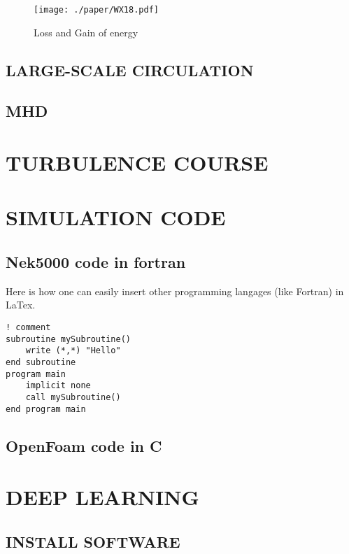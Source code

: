 \documentclass{hmj}
\begin{document}
\begin{figure}
  \centering
  \centering
  \texttt{[image: ./paper/WX18.pdf]}
  \renewcommand{\figurename}{Figure}
  \caption{Loss and Gain of energy}
  \renewcommand{\figurename}{图}
\label{fig3}
\end{figure}

\subsection{LARGE-SCALE CIRCULATION}

\subsection{MHD}

\section{TURBULENCE COURSE}

\section{SIMULATION CODE}
\subsection{Nek5000 code in fortran}

Here is how one can easily insert other programming langages (like Fortran) in LaTex.
\begin{lstlisting}
! comment
subroutine mySubroutine()
    write (*,*) "Hello"
end subroutine
program main
    implicit none
    call mySubroutine()
end program main
\end{lstlisting}

\subsection{OpenFoam code in C}


\section{DEEP LEARNING}

\subsection{INSTALL SOFTWARE}
\end{document}
